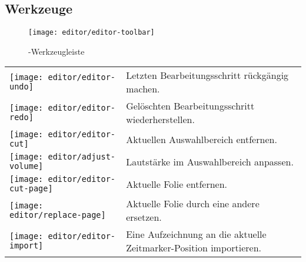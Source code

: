 \subsection{Werkzeuge}
\label{section:editor:toolbar}

\begin{figure}[H]
	\centering
	\texttt{[image: editor/editor-toolbar]}
	\caption{\lectEditor{}-Werkzeugleiste}
	\label{fig:editor-toolbar}
\end{figure}


\begin{longtable}{p{1cm}p{12cm}}
	\begin{minipage}{.035\textwidth}
		\texttt{[image: editor/editor-undo]}
	\end{minipage}
	& Letzten Bearbeitungsschritt rückgängig machen. \\

	\begin{minipage}{.035\textwidth}
		\texttt{[image: editor/editor-redo]}
	\end{minipage}
	& Gelöschten Bearbeitungsschritt wiederherstellen. \\

	\begin{minipage}{.035\textwidth}
		\texttt{[image: editor/editor-cut]}
	\end{minipage}
	& Aktuellen Auswahlbereich entfernen. \\

	\begin{minipage}{.035\textwidth}
		\texttt{[image: editor/adjust-volume]}
	\end{minipage}
	& Lautstärke im Auswahlbereich anpassen. \\

	\begin{minipage}{.035\textwidth}
		\texttt{[image: editor/editor-cut-page]}
	\end{minipage}
	& Aktuelle Folie entfernen. \\

	\begin{minipage}{.035\textwidth}
		\texttt{[image: editor/replace-page]}
	\end{minipage}
	& Aktuelle Folie durch eine andere ersetzen. \\

	\begin{minipage}{.035\textwidth}
		\texttt{[image: editor/editor-import]}
	\end{minipage}
	& Eine Aufzeichnung an die aktuelle Zeitmarker-Position importieren. \\


\end{longtable}
